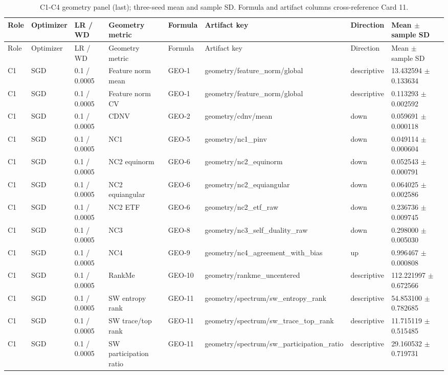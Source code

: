 \begin{longtable}{llllllll}
\caption{C1-C4 geometry panel (last); three-seed mean and sample SD. Formula and artifact columns cross-reference Card 11.}\\
Role & Optimizer & LR / WD & Geometry metric & Formula & Artifact key & Direction & Mean $\pm$ sample SD \\
\hline
\endfirsthead
Role & Optimizer & LR / WD & Geometry metric & Formula & Artifact key & Direction & Mean $\pm$ sample SD \\
\hline
\endhead
C1 & SGD & 0.1 / 0.0005 & Feature norm mean & GEO-1 & geometry/feature\_norm/global & descriptive & 13.432594 $\pm$ 0.133634 \\
C1 & SGD & 0.1 / 0.0005 & Feature norm CV & GEO-1 & geometry/feature\_norm/global & descriptive & 0.113293 $\pm$ 0.002592 \\
C1 & SGD & 0.1 / 0.0005 & CDNV & GEO-2 & geometry/cdnv/mean & down & 0.059691 $\pm$ 0.000118 \\
C1 & SGD & 0.1 / 0.0005 & NC1 & GEO-5 & geometry/nc1\_pinv & down & 0.049114 $\pm$ 0.000604 \\
C1 & SGD & 0.1 / 0.0005 & NC2 equinorm & GEO-6 & geometry/nc2\_equinorm & down & 0.052543 $\pm$ 0.000791 \\
C1 & SGD & 0.1 / 0.0005 & NC2 equiangular & GEO-6 & geometry/nc2\_equiangular & down & 0.064025 $\pm$ 0.002586 \\
C1 & SGD & 0.1 / 0.0005 & NC2 ETF & GEO-6 & geometry/nc2\_etf\_raw & down & 0.236736 $\pm$ 0.009745 \\
C1 & SGD & 0.1 / 0.0005 & NC3 & GEO-8 & geometry/nc3\_self\_duality\_raw & down & 0.298000 $\pm$ 0.005030 \\
C1 & SGD & 0.1 / 0.0005 & NC4 & GEO-9 & geometry/nc4\_agreement\_with\_bias & up & 0.996467 $\pm$ 0.000808 \\
C1 & SGD & 0.1 / 0.0005 & RankMe & GEO-10 & geometry/rankme\_uncentered & descriptive & 112.221997 $\pm$ 0.672566 \\
C1 & SGD & 0.1 / 0.0005 & SW entropy rank & GEO-11 & geometry/spectrum/sw\_entropy\_rank & descriptive & 54.853100 $\pm$ 0.782685 \\
C1 & SGD & 0.1 / 0.0005 & SW trace/top rank & GEO-11 & geometry/spectrum/sw\_trace\_top\_rank & descriptive & 11.715119 $\pm$ 0.515485 \\
C1 & SGD & 0.1 / 0.0005 & SW participation ratio & GEO-11 & geometry/spectrum/sw\_participation\_ratio & descriptive & 29.160532 $\pm$ 0.719731 \\

\end{longtable}
